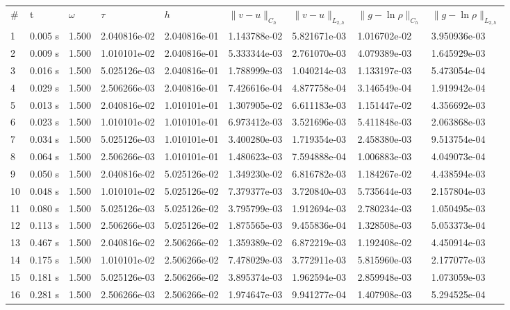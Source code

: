 \documentclass[12pt]{article}
\begin{document}
\begin{center}
\begin{tabular}{lllllllll}
\# & t & $\omega$ & $\tau$ & $h$ & $\|v - u\|_{C_h}$ & $\|v - u\|_{L_{2,h}}$ & $\|g - \ln\rho\|_{C_h}$ & $\|g - \ln\rho\|_{L_{2,h}}$ \\

1&      0.005 s&      1.500&      2.040816e-02&      2.040816e-01&      1.143788e-02&      5.821671e-03&      1.016702e-02&      3.950936e-03\\
2&      0.009 s&      1.500&      1.010101e-02&      2.040816e-01&      5.333344e-03&      2.761070e-03&      4.079389e-03&      1.645929e-03\\
3&      0.016 s&      1.500&      5.025126e-03&      2.040816e-01&      1.788999e-03&      1.040214e-03&      1.133197e-03&      5.473054e-04\\
4&      0.029 s&      1.500&      2.506266e-03&      2.040816e-01&      7.426616e-04&      4.877758e-04&      3.146549e-04&      1.919942e-04\\
5&      0.013 s&      1.500&      2.040816e-02&      1.010101e-01&      1.307905e-02&      6.611183e-03&      1.151447e-02&      4.356692e-03\\
6&      0.023 s&      1.500&      1.010101e-02&      1.010101e-01&      6.973412e-03&      3.521696e-03&      5.411848e-03&      2.063868e-03\\
7&      0.034 s&      1.500&      5.025126e-03&      1.010101e-01&      3.400280e-03&      1.719354e-03&      2.458380e-03&      9.513754e-04\\
8&      0.064 s&      1.500&      2.506266e-03&      1.010101e-01&      1.480623e-03&      7.594888e-04&      1.006883e-03&      4.049073e-04\\
9&      0.050 s&      1.500&      2.040816e-02&      5.025126e-02&      1.349230e-02&      6.816782e-03&      1.184267e-02&      4.438594e-03\\
10&      0.048 s&      1.500&      1.010101e-02&      5.025126e-02&      7.379377e-03&      3.720840e-03&      5.735644e-03&      2.157804e-03\\
11&      0.080 s&      1.500&      5.025126e-03&      5.025126e-02&      3.795799e-03&      1.912694e-03&      2.780234e-03&      1.050495e-03\\
12&      0.113 s&      1.500&      2.506266e-03&      5.025126e-02&      1.875565e-03&      9.455836e-04&      1.328508e-03&      5.053373e-04\\
13&      0.467 s&      1.500&      2.040816e-02&      2.506266e-02&      1.359389e-02&      6.872219e-03&      1.192408e-02&      4.450914e-03\\
14&      0.175 s&      1.500&      1.010101e-02&      2.506266e-02&      7.478029e-03&      3.772911e-03&      5.815960e-03&      2.177077e-03\\
15&      0.181 s&      1.500&      5.025126e-03&      2.506266e-02&      3.895374e-03&      1.962594e-03&      2.859948e-03&      1.073059e-03\\
16&      0.281 s&      1.500&      2.506266e-03&      2.506266e-02&      1.974647e-03&      9.941277e-04&      1.407908e-03&      5.294525e-04\\
\end{tabular}
\end{center}
\end{document}
